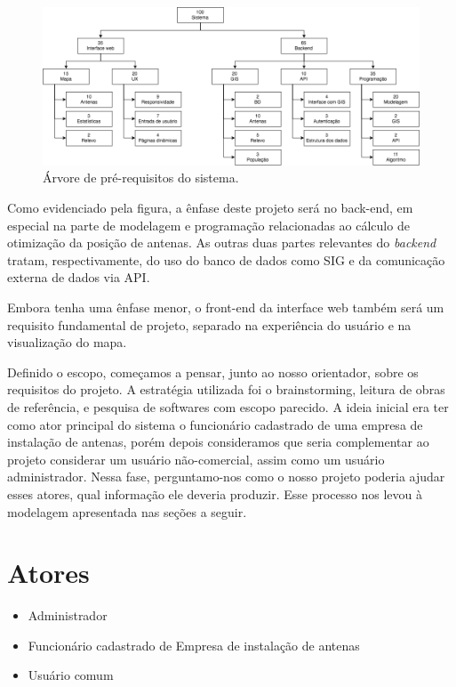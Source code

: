 \documentclass[]{politex}
\begin{document}
\begin{figure}[H]
  \centering
  \includegraphics[width=5.5in]{imagens/arvore_prerequisitos}
  \caption{Árvore de pré-requisitos do sistema.}
  \label{fig:arvore_prerequisitos}
\end{figure}

Como evidenciado pela figura, a ênfase deste projeto será no back-end, em
especial na parte de modelagem e programação relacionadas ao cálculo de
otimização da posição de antenas. As outras duas partes relevantes do 
\emph{backend} tratam, respectivamente, do uso do banco de dados como SIG e da
comunicação externa de dados via API.

Embora tenha uma ênfase menor, o front-end da interface web também será
um requisito fundamental de projeto, separado na experiência do usuário e na
visualização do mapa.

Definido o escopo, começamos a pensar, junto ao nosso orientador, sobre os 
requisitos do projeto. A estratégia utilizada foi o brainstorming, leitura de 
obras de referência, e pesquisa de softwares com escopo parecido.
A ideia inicial era ter como ator principal do sistema o funcionário cadastrado
de uma empresa de instalação de antenas, porém depois consideramos que seria
complementar ao projeto considerar um usuário não-comercial, assim
como um usuário administrador. Nessa fase, perguntamo-nos como o nosso projeto
poderia ajudar esses atores, qual informação ele deveria produzir. Esse processo
nos levou à modelagem apresentada nas seções a seguir.

\section{Atores}
\begin{itemize}
\item Administrador
\item Funcionário cadastrado de Empresa de instalação de antenas
\item Usuário comum
\end{itemize}
\end{document}
